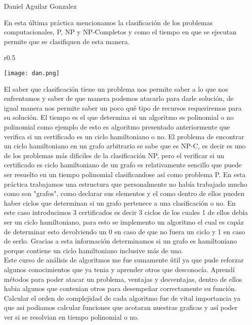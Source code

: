 \documentclass[12pt,twoside]{article}
\begin{document}
\newline \newline \newline \newline
Daniel Aguilar Gonzalez\newline

En esta última práctica mencionamos la clasificación de los problemas computacionales, P, NP y NP-Completos y como el tiempo en que se ejecutan permite que se clasifiquen de esta manera.

\begin{wrapfigure}{r}{0.5\textwidth}
  \begin{center}
    \texttt{[image: dan.png]}
\end{center}
\end{wrapfigure}
El saber que clasificación tiene un problema nos permite saber a lo que nos enfrentamos y saber de que manera podemos atacarlo para darle solución, de igual manera nos permite saber un poco qué tipo de recursos requeriremos para su solución.
El tiempo es el que determina si un algoritmo es polinomial o no polinomial como ejemplo de esto es algoritmo presentado anteriormente que verifica si un certificado es un ciclo hamiltoniano o no. El problema de encontrar un ciclo hamiltoniano en un grafo arbitrario se sabe que es NP-C, es decir es uno de los problemas más dificiles de la clasificación NP, pero el verificar si un certificado es ciclo hamiltoniano de un grafo es relativamente sencillo que puede ser resuelto en un tiempo polinomial clasificandose así como problema P.
En esta práctica trabajamos una estructura que personalmente no había trabajado mucho como son "grafos", como declarar sus elementos y el como dentro de ellos pueden haber ciclos que determinan si un grafo pertenece a una clasificación o no. En este caso introducimos 3 certificados es decir 3 ciclos de los cuales 1 de ellos debía ser un ciclo hamiltoniano, para esto se implemento un algoritmo el cual es capáz de determinar esto devolviendo un 0 en caso de que no fuera un ciclo y 1 en caso de serlo. Gracias a esta información determinamos si un grafo es hamiltoniano porque contiene un ciclo hamiltoniano inclusive más de uno. \\
Este curso de análisis de algoritmos me fue sumamente útil ya que pude reforzar algunos conocimientos que ya tenia y aprender otros que desconocía. Aprendí métodos para poder atacar un problema, ventajas y desventajas, dentro de ellos habia algunos que contenian otros para desempeñar correctamente su función. Calcular el orden de complejidad de cada algoritmo fue de vital importancia ya que asi podiamos calcular funciones que acotaran nuestras graficas y así poder  ver si se resolvian en tiempo polinomial o no.
\end{document}
